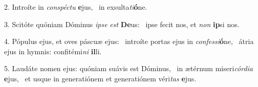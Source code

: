 2. Introíte in \textit{con}\textit{spéc}\textit{tu} \textbf{e}jus, \ast\  in exsulta\textit{ti}\textbf{ó}ne.\

3. Scitóte quóniam Dóminus \textit{ip}\textit{se} \textit{est} \textbf{De}us: \ast\  ipse fecit nos, et \textit{non} \textbf{ip}si nos.\

4. Pópulus ejus, et oves páscuæ ejus: \dag\  introíte portas ejus in \textit{con}\textit{fes}\textit{si}\textbf{ó}ne, \ast\  átria ejus in hymnis: confitémi\textit{ni} \textbf{il}li.\

5. Laudáte nomen ejus: quóniam suávis est Dóminus, \dag\  in ætérnum miseri\textit{cór}\textit{di}\textit{a} \textbf{e}jus, \ast\  et usque in generatiónem et generatiónem véri\textit{tas} \textbf{e}jus.\

